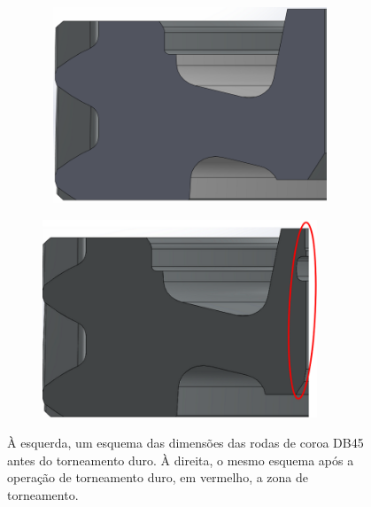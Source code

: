 \begin{figure}[htb]
    \centering
    \begin{subfigure}{.5\textwidth}\
        \centering
        \includegraphics[width = 0.9\textwidth]{Figures/Cap3/DB45_antes_torn.png}
        \caption{}
        \label{fig:Coroa_antes_torneamento}
    \end{subfigure}%
    \begin{subfigure}{.5\textwidth}
        \centering
        \includegraphics[width = 0.9\textwidth]{Figures/Cap3/DB45_apos_torn.png}
        \caption{}
        \label{fig:Coroa_apos_torneamento}
    \end{subfigure}
    \caption[Imagens das rodas de coroa antes e após o torneamento duro]%
    {À esquerda, um esquema das dimensões das rodas de coroa DB45 antes do torneamento duro. À direita, o mesmo esquema após a operação de torneamento duro, em vermelho, a zona de torneamento.}
\end{figure}

